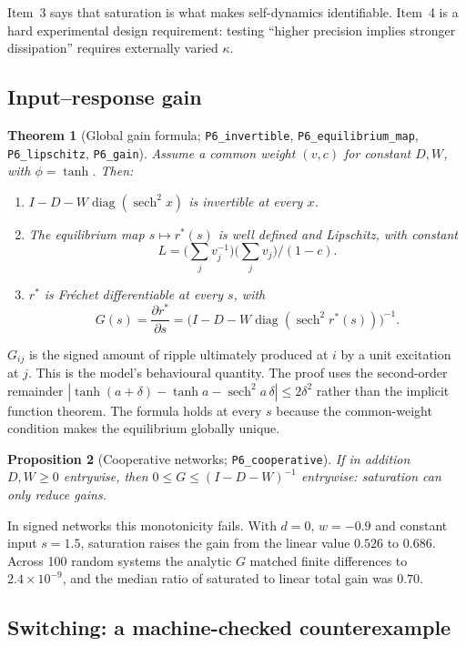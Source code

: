 \documentclass[11pt]{article}
\newtheorem{theorem}{Theorem}
\newtheorem{proposition}[theorem]{Proposition}
\theoremstyle{definition}
\theoremstyle{remark}
\newcommand{\lean}[1]{\texttt{\small #1}}
\newcommand{\sech}{\operatorname{sech}}
\newcommand{\diag}{\operatorname{diag}}
\begin{document}
Item~3 says that saturation is what makes self-dynamics identifiable. Item~4 is a hard experimental
design requirement: testing ``higher precision implies stronger dissipation'' requires externally
varied $\kappa$.

\subsection{Input--response gain}

\begin{theorem}[Global gain formula; \lean{P6\_invertible}, \lean{P6\_equilibrium\_map}, \lean{P6\_lipschitz}, \lean{P6\_gain}]\label{thm:gain}
Assume a common weight $(v,c)$ for constant $D,W$, with $\phi=\tanh$. Then:
\begin{enumerate}
\item $I-D-W\diag(\sech^2x)$ is invertible at every $x$.
\item The equilibrium map $s\mapsto r^*(s)$ is well defined and Lipschitz, with constant
      \[ L=\Big(\sum_j v_j^{-1}\Big)\Big(\sum_j v_j\Big)\Big/(1-c). \]
\item $r^*$ is Fréchet differentiable at every $s$, with
      \[ G(s)=\frac{\partial r^*}{\partial s}=\big(I-D-W\diag(\sech^2 r^*(s))\big)^{-1}. \]
\end{enumerate}
\end{theorem}

$G_{ij}$ is the signed amount of ripple ultimately produced at $i$ by a unit excitation at $j$. This is
the model's behavioural quantity. The proof uses the second-order remainder
$|\tanh(a+\delta)-\tanh a-\sech^2a\,\delta|\le2\delta^2$ rather than the implicit function theorem. The
formula holds at every $s$ because the common-weight condition makes the equilibrium globally unique.

\begin{proposition}[Cooperative networks; \lean{P6\_cooperative}]
If in addition $D,W\ge0$ entrywise, then $0\le G\le(I-D-W)^{-1}$ entrywise: saturation can only reduce gains.
\end{proposition}

In signed networks this monotonicity fails. With $d=0$, $w=-0.9$ and constant input $s=1.5$, saturation
raises the gain from the linear value $0.526$ to $0.686$. Across 100 random systems the analytic $G$ matched finite differences to
$2.4\times10^{-9}$, and the median ratio of saturated to linear total gain was $0.70$.

\subsection{Switching: a machine-checked counterexample}\label{sec:switch}
\end{document}
